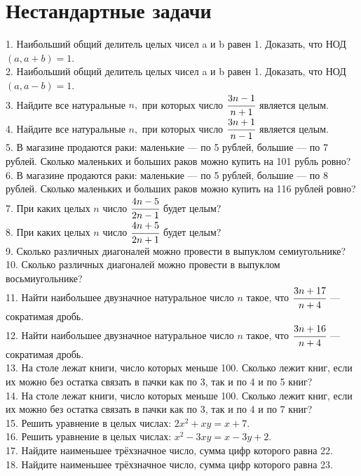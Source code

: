 \documentclass[12pt]{article}
\begin{document}
\section{Нестандартные задачи}
1. Наибольший общий делитель целых чисел a и b равен 1. Доказать, что
НОД$(a, a+b)=1.$\\
2. Наибольший общий делитель целых чисел a и b равен 1. Доказать, что
НОД$(a, a-b)=1.$\\
3. Найдите все натуральные $n,$ при которых число $\cfrac{3n-1}{n+1}$ является целым.\\
4. Найдите все натуральные $n,$ при которых число $\cfrac{3n+1}{n-1}$ является целым.\\
5. В магазине продаются раки: маленькие --- по 5 рублей, большие --- по 7 рублей. Сколько маленьких и больших раков можно купить на 101 рубль ровно?\\
6. В магазине продаются раки: маленькие --- по 5 рублей, большие --- по 8 рублей. Сколько маленьких и больших раков можно купить на 116 рублей ровно?\\
7. При каких целых $n$ число $\cfrac{4n-5}{2n-1}$ будет целым?\\
8. При каких целых $n$ число $\cfrac{4n+5}{2n+1}$ будет целым?\\
9. Сколько различных диагоналей можно провести в выпуклом семиугольнике?\\
10. Сколько различных диагоналей можно провести в выпуклом восьмиугольнике?\\
11. Найти наибольшее двузначное натуральное число $n$ такое, что $\cfrac{3n+17}{n+4}$ --- сократимая дробь.\\
12. Найти наибольшее двузначное натуральное число $n$ такое, что $\cfrac{3n+16}{n+4}$ --- сократимая дробь.\\
13. На столе лежат книги, число которых меньше 100. Сколько лежит книг, если их можно без остатка связать в пачки как по 3, так и по 4 и по 5 книг?\\
14. На столе лежат книги, число которых меньше 100. Сколько лежит книг, если их можно без остатка связать в пачки как по 3, так и по 4 и по 7 книг?\\
15. Решить уравнение в целых числах: $2x^2+xy=x+7.$\\
16. Решить уравнение в целых числах: $x^2-3xy=x-3y+2.$\\
17. Найдите наименьшее трёхзначное число, сумма цифр которого равна 22.\\
18. Найдите наименьшее трёхзначное число, сумма цифр которого равна 23.\\
\end{document}
